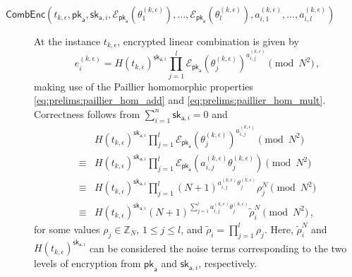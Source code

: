 \begin{description}
    \item[$\mathsf{CombEnc}(t_{k,\epsilon}, \mathsf{pk}_{\mathsf{a}}, \mathsf{sk}_{\mathsf{a},i}, \mathcal{E}_{\mathsf{pk}_{\mathsf{a}}}(\theta_1^{(k,\epsilon)}),\dots,\mathcal{E}_{\mathsf{pk}_{\mathsf{a}}}(\theta_l^{(k,\epsilon)}), a^{(k,\epsilon)}_{i,1},\dots,a^{(k,\epsilon)}_{i,l})$] At the instance $t_{k,\epsilon}$, encrypted linear combination is given by 
    \begin{equation}\label{eq:nonlin_fusion:lca_scheme_lin_comb}
        e^{(k,\epsilon)}_i = H(t_{k,\epsilon})^{\mathsf{sk}_{\mathsf{a},i}}\prod^{l}_{j=1}\mathcal{E}_{\mathsf{pk}_{\mathsf{a}}}(\theta^{(k,\epsilon)}_j)^{a^{(k,\epsilon)}_{i,j}} \pmod{N^2}\,,
    \end{equation}
    making use of the Paillier homomorphic properties \eqref{eq:prelims:paillier_hom_add} and \eqref{eq:prelims:paillier_hom_mult}. Correctness follows from $\sum^{n}_{i=1}\mathsf{sk}_{\mathsf{a},i}=0$ and
    \begin{equation*}
        \begin{split}
            & H(t_{k,\epsilon})^{\mathsf{sk}_{\mathsf{a},i}}\prod^{l}_{j=1}\mathcal{E}_{\mathsf{pk}_{\mathsf{a}}}(\theta^{(k,\epsilon)}_j)^{a^{(k,\epsilon)}_{i,j}} \pmod{N^2} \\
            \equiv& H(t_{k,\epsilon})^{\mathsf{sk}_{\mathsf{a},i}}\prod^{l}_{j=1}\mathcal{E}_{\mathsf{pk}_{\mathsf{a}}}(a^{(k,\epsilon)}_{i,j}\theta^{(k,\epsilon)}_j) \pmod{N^2} \\
            \equiv& H(t_{k,\epsilon})^{\mathsf{sk}_{\mathsf{a},i}}\prod^{l}_{j=1}(N+1)^{a^{(k,\epsilon)}_{i,j}\theta^{(k,\epsilon)}_j} \rho^{N}_{j} \pmod{N^2} \\
            \equiv& H(t_{k,\epsilon})^{\mathsf{sk}_{\mathsf{a},i}}(N+1)^{\sum^{l}_{j=1}a^{(k,\epsilon)}_{i,j}\theta^{(k,\epsilon)}_j} \tilde{\rho}_{i}^{N} \pmod{N^2}\,,
        \end{split}
    \end{equation*}
    for some values $\rho_j \in \mathbb{Z}_N$, $1\leq j\leq l$, and $\tilde{\rho}_i=\prod^{l}_{j=1}\rho_j$. Here, $\tilde{\rho}_i^N$ and $H(t_{k,\epsilon})^{\mathsf{sk}_{\mathsf{a}, i}}$ can be considered the noise terms corresponding to the two levels of encryption from $\mathsf{pk}_{\mathsf{a}}$ and $\mathsf{sk}_{\mathsf{a}, i}$, respectively.


\end{description}
